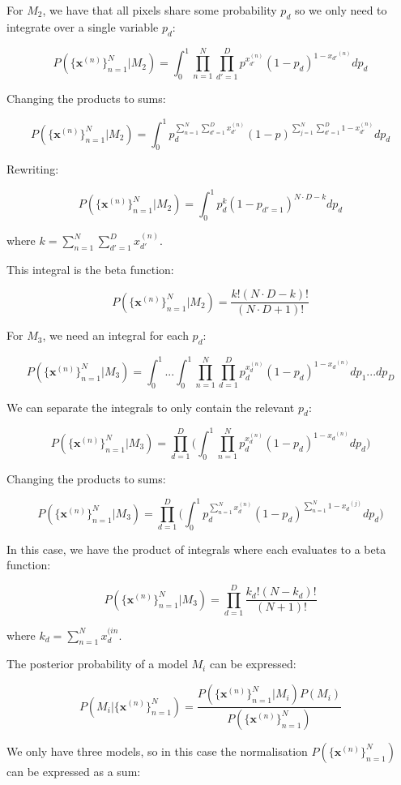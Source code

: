 \documentclass[12pt]{article}
\begin{document}
\begin{enumerate}
For $M_2$, we have that all pixels share some probability $p_d$ so we only need to integrate over a single variable $p_d$:

$$P( \{\textbf{x}^{(n)}\}_{n=1}^{N}|M_2) = \int_0^1 \prod_{n=1}^{N} \prod_{d'=1}^D p^{x_{d'}^{(n)}} (1-p_d)^{1-{x_{d'}}^{(n)}} dp_d$$

Changing the products to sums:

$$P( \{\textbf{x}^{(n)}\}_{n=1}^{N}|M_2) = \int_0^1  p_d^{\sum_{n=1}^{N} \sum_{d'=1}^D x_{d'}^{(n)}} (1-p)^{\sum_{j=1}^{N} \sum_{d'=1}^D 1-{x_{d'}^{(n)}}} d p_d$$

Rewriting:

$$P( \{\textbf{x}^{(n)}\}_{n=1}^{N}|M_2) = \int_0^1  p_d^{k} (1- p_{d'=1})^{N\cdot D-k} d p_d$$

where $k =\sum_{n=1}^{N} \sum_{d'=1}^D x_{d'}^{(n)}$.

This integral is the beta function:

$$P( \{\textbf{x}^{(n)}\}_{n=1}^{N}|M_2) = \frac{k! (N\cdot D-k)!}{(N\cdot D+1)!}$$

For $M_3$, we need an integral for each $p_d$:

$$P( \{\textbf{x}^{(n)}\}_{n=1}^{N}|M_3) = \int_0^1 ... \int_0^1 \prod_{n=1}^{N} \prod_{d=1}^D  p_d^{x_d^{(n)}} (1- p_d)^{1-{x_d}^{(n)}} d p_1 ... d p_D$$

We can separate the integrals to only contain the relevant $p_d$:

$$P( \{\textbf{x}^{(n)}\}_{n=1}^{N}|M_3) = \prod_{d=1}^D \Bigg( \int_0^1 \prod_{n=1}^{N}   p_d^{x_d^{(n)}} (1- p_d)^{1-{x_d}^{(n)}} d p_d \Bigg)$$

Changing the products to sums:

$$P( \{\textbf{x}^{(n)}\}_{n=1}^{N}|M_3) = \prod_{d=1}^D \Bigg( \int_0^1   p_d^{\sum_{n=1}^{N} x_d^{(n)}} (1- p_d)^{\sum_{n=1}^{N} 1-{x_d}^{(j)}} d p_d \Bigg)$$

In this case, we have the product of integrals where each evaluates to a beta function:

$$P( \{\textbf{x}^{(n)}\}_{n=1}^{N}|M_3) = \prod_{d=1}^D \frac{k_d! (N-k_d)!}{(N+1)!}$$

where $k_d = \sum_{n=1}^{N} x_d^{(in}$.

The posterior probability of a model $M_i$ can be expressed:

$$P(M_i |  \{\textbf{x}^{(n)}\}_{n=1}^{N}) = \frac{P( \{\textbf{x}^{(n)}\}_{n=1}^{N}|M_i)P(M_i)}{P( \{\textbf{x}^{(n)}\}_{n=1}^{N})}$$

We only have three models, so in this case the normalisation $P(\{\textbf{x}^{(n)}\}_{n=1}^{N})$ can be expressed as a sum:


\end{enumerate}
\end{document}
